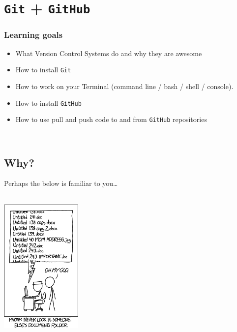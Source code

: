 \documentclass[
]{book}
\providecommand{\tightlist}{%
  \setlength{\itemsep}{0pt}\setlength{\parskip}{0pt}}
\begin{document}
\hypertarget{git-github}{%
\chapter{\texorpdfstring{\texttt{Git} + \texttt{GitHub}}{Git + GitHub}}\label{git-github}}

\hypertarget{learning-goals-16}{%
\subsection*{Learning goals}\label{learning-goals-16}}

\begin{itemize}
\tightlist
\item
  What Version Control Systems do and why they are awesome\\
\item
  How to install \texttt{Git}
\item
  How to work on your Terminal (command line / bash / shell / console).\\
\item
  How to install \texttt{GitHub}\\
\item
  How to use pull and push code to and from \texttt{GitHub} repositories
\end{itemize}

~

\hypertarget{why}{%
\section*{Why?}\label{why}}

Perhaps the below is familiar to you\ldots{}

~\\

\includegraphics[width=0.3\textwidth,height=\textheight]{img/version_control.png}
\end{document}
